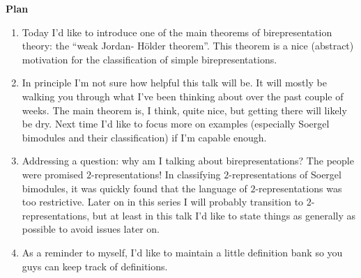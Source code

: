 \noindent\textbf{Plan}
\begin{enumerate}[label=$\bullet$, leftmargin=1\parindent]
\item Today I'd like to introduce one of the main theorems of birepresentation theory: the ``weak Jordan- H\"{o}lder theorem''. This theorem is a nice (abstract) motivation for the classification of simple birepresentations.
\item In principle I'm not sure how helpful this talk will be. It will mostly be walking you through what I've been thinking about over the past couple of weeks. The main theorem is, I think, quite nice, but getting there will likely be dry. Next time I'd like to focus more on examples (especially Soergel bimodules and their classification) if I'm capable enough.
\item Addressing a question: why am I talking about birepresentations? The people were promised $2$-representations! In classifying $2$-representations of Soergel bimodules, it was quickly found that the language of $2$-representations was too restrictive. Later on in this series I will probably transition to $2$-representations, but at least in this talk I'd like to state things as generally as possible to avoid issues later on.
\item As a reminder to myself, I'd like to maintain a little definition bank so you guys can keep track of definitions.\\
\end{enumerate}

